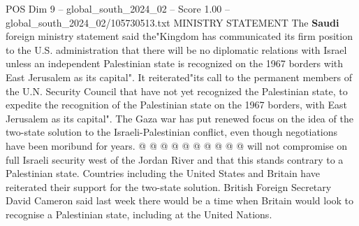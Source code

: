 \begin{textsample}{POS Dim 9 – global\_south\_2024\_02 – Score 1.00 – global\_south\_2024\_02/105730513.txt}
MINISTRY STATEMENT The \textbf{Saudi} foreign ministry statement said the"Kingdom has communicated its firm position to the U.S. administration that there will be no diplomatic relations with Israel unless an independent Palestinian state is recognized on the 1967 borders with East Jerusalem as its capital".
It reiterated"its call to the permanent members of the U.N.
Security Council that have not yet recognized the Palestinian state, to expedite the recognition of the Palestinian state on the 1967 borders, with East Jerusalem as its capital".
The Gaza war has put renewed focus on the idea of the two-state solution to the Israeli-Palestinian conflict, even though negotiations have been moribund for years. @ @ @ @ @ @ @ @ @ @ will not compromise on full Israeli security west of the Jordan River and that this stands contrary to a Palestinian state.
Countries including the United States and Britain have reiterated their support for the two-state solution.
British Foreign Secretary David Cameron said last week there would be a time when Britain would look to recognise a Palestinian state, including at the United Nations.

\end{textsample}
